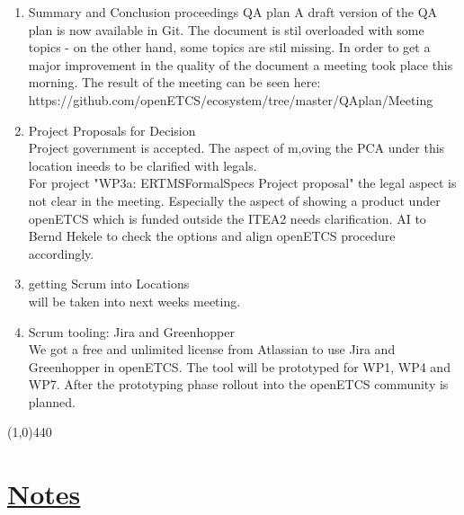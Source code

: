 \documentclass[a4paper]{article}
\begin{document}
\begin{enumerate}

\item Summary and Conclusion proceedings QA plan
A draft version of the QA plan is now available in Git. The document is stil overloaded with some topics - on the other hand, some topics are stil missing. In order to get a major improvement in the quality of the document a meeting took place this morning. The result of the meeting can be seen here: \\
https://github.com/openETCS/ecosystem/tree/master/QAplan/Meeting%

\item Project Proposals for Decision\\
Project government is accepted. The aspect of m,oving the PCA under this location  ineeds to be clarified with legals.\\
For project "WP3a: ERTMSFormalSpecs Project proposal" the legal aspect is not clear in the meeting. Especially the aspect of showing a product under openETCS which is funded outside the ITEA2 needs clarification. AI to Bernd Hekele to check the options and align openETCS procedure accordingly.

\item getting Scrum into Locations\\
will be taken into next weeks meeting.
\item Scrum tooling: Jira and Greenhopper\\
We got a free and unlimited license from Atlassian to use Jira and Greenhopper in openETCS. The tool will be prototyped for WP1, WP4 and WP7. After the prototyping phase rollout into the openETCS community is planned.

\end{enumerate}

\line(1,0){440}
\section*{\underline{Notes}}
\end{document}
